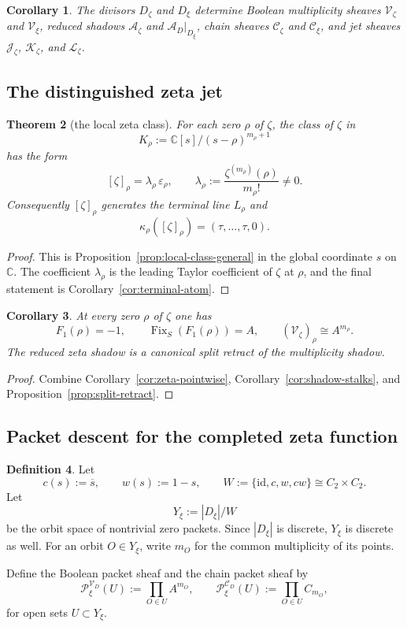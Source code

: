 \documentclass[11pt,a4paper]{article}
\newtheorem{theorem}{Theorem}[section]
\newtheorem{corollary}[theorem]{Corollary}
\theoremstyle{definition}
\newtheorem{definition}[theorem]{Definition}
\theoremstyle{remark}
\DeclareMathOperator{\Fix}{Fix}
\newcommand{\CC}{\mathbb C}
\newcommand{\taup}{\tau}
\newcommand{\Vd}{\mathcal V_D}
\newcommand{\Ad}{\mathcal A_D}
\newcommand{\Cd}{\mathcal C_D}
\newcommand{\Vz}{\mathcal V_\zeta}
\newcommand{\Az}{\mathcal A_\zeta}
\newcommand{\Cz}{\mathcal C_\zeta}
\newcommand{\Jz}{\mathcal J_\zeta}
\newcommand{\Kz}{\mathcal K_\zeta}
\newcommand{\Lz}{\mathcal L_\zeta}
\newcommand{\Vxi}{\mathcal V_\xi}
\newcommand{\Cxi}{\mathcal C_\xi}
\newcommand{\epsrho}{\varepsilon_\rho}
\begin{document}
\begin{corollary}\label{cor:zeta-shadow-sheaves}
The divisors $D_\zeta$ and $D_\xi$ determine Boolean multiplicity sheaves $\Vz$ and $\Vxi$, reduced shadows $\Az$ and $\Ad|_{D_\xi}$, chain sheaves $\Cz$ and $\Cxi$, and jet sheaves $\Jz$, $\Kz$, and $\Lz$.
\end{corollary}

\subsection{The distinguished zeta jet}

\begin{theorem}[the local zeta class]\label{thm:local-zeta-class}
For each zero $\rho$ of $\zeta$, the class of $\zeta$ in
\[
K_\rho:=\CC[s]/(s-\rho)^{m_\rho+1}
\]
has the form
\[
[\zeta]_\rho=\lambda_\rho\,\epsrho,
\qquad
\lambda_\rho:=\frac{\zeta^{(m_\rho)}(\rho)}{m_\rho!}\neq 0.
\]
Consequently $[\zeta]_\rho$ generates the terminal line $L_\rho$ and
\[
\kappa_\rho([\zeta]_\rho)=(\taup,\dots,\taup,0).
\]
\end{theorem}

\begin{proof}
This is Proposition~\ref{prop:local-class-general} in the global coordinate $s$ on $\CC$. The coefficient $\lambda_\rho$ is the leading Taylor coefficient of $\zeta$ at $\rho$, and the final statement is Corollary~\ref{cor:terminal-atom}.
\end{proof}

\begin{corollary}
At every zero $\rho$ of $\zeta$ one has
\[
F_1(\rho)=-1,
\qquad
\Fix_S(F_1(\rho))=A,
\qquad
(\Vz)_\rho\cong A^{m_\rho}.
\]
The reduced zeta shadow is a canonical split retract of the multiplicity shadow.
\end{corollary}

\begin{proof}
Combine Corollary~\ref{cor:zeta-pointwise}, Corollary~\ref{cor:shadow-stalks}, and Proposition~\ref{prop:split-retract}.
\end{proof}

\subsection{Packet descent for the completed zeta function}

\begin{definition}
Let
\[
c(s):=\overline s,
\qquad
w(s):=1-s,
\qquad
W:=\{\mathrm{id},c,w,cw\}\cong C_2\times C_2.
\]
Let
\[
Y_\xi:=|D_\xi|/W
\]
be the orbit space of nontrivial zero packets. Since $|D_\xi|$ is discrete, $Y_\xi$ is discrete as well. For an orbit $O\in Y_\xi$, write $m_O$ for the common multiplicity of its points.

Define the Boolean packet sheaf and the chain packet sheaf by
\[
\mathcal P_\xi^{\Vd}(U):=\prod_{O\in U} A^{m_O},
\qquad
\mathcal P_\xi^{\Cd}(U):=\prod_{O\in U} C_{m_O},
\]
for open sets $U\subset Y_\xi$.
\end{definition}
\end{document}
